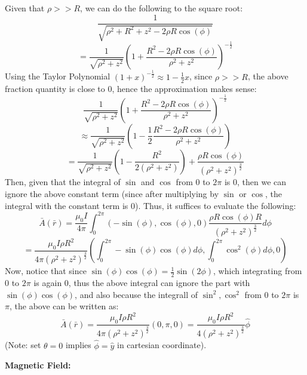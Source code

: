\documentclass{article}
\begin{document}
Given that $\rho>>R$, we can do the following to the square root:
$$\frac{1}{\sqrt{\rho^2+R^2+z^2-2\rho R\cos(\phi)}}$$
$$=\frac{1}{\sqrt{\rho^2+z^2}}\left(1+\frac{R^2-2\rho R\cos(\phi)}{\rho^2+z^2}\right)^{-\frac{1}{2}}$$
Using the Taylor Polynomial $(1+x)^{-\frac{1}{2}}\approx 1-\frac{1}{2}x$, since $\rho>>R$, the above fraction quantity is close to $0$, hence the approximation makes sense:
$$\frac{1}{\sqrt{\rho^2+z^2}}\left(1+\frac{R^2-2\rho R\cos(\phi)}{\rho^2+z^2}\right)^{-\frac{1}{2}}$$
$$\approx \frac{1}{\sqrt{\rho^2+z^2}}\left(1-\frac{1}{2}\frac{R^2-2\rho R\cos(\phi)}{\rho^2+z^2}\right)$$
$$=\frac{1}{\sqrt{\rho^2+z^2}}\left(1-\frac{R^2}{2(\rho^2+z^2)}\right)+\frac{\rho R\cos(\phi)}{(\rho^2+z^2)^{\frac{3}{2}}}$$
Then, given that the integral of $\sin$ and $\cos$ from $0$ to $2\pi$ is $0$, then we can ignore the above constant term (since after multiplying by $\sin$ or $\cos$, the integral with the constant term is $0$).
Thus, it suffices to evaluate the following:
$$\bar{A}(\bar{r})=\frac{\mu_0 I}{4\pi}\int_{0}^{2\pi}(-\sin(\phi),\cos(\phi),0)\frac{\rho R\cos(\phi)R}{(\rho^2+z^2)^{\frac{3}{2}}}d\phi$$
$$=\frac{\mu_0I\rho R^2}{4\pi(\rho^2+z^2)^{\frac{3}{2}}}\left(\int_{0}^{2\pi}-\sin(\phi)\cos(\phi)d\phi,\int_{0}^{2\pi}\cos^2(\phi)d\phi,0\right)$$
Now, notice that since $\sin(\phi)\cos(\phi)=\frac{1}{2}\sin(2\phi)$, which integrating from $0$ to $2\pi$ is again $0$, thus the above integral can ignore the part with $\sin(\phi)\cos(\phi)$, 
and also because the integrall of $\sin^2,\cos^2$ from $0$ to $2\pi$ is $\pi$, the above can be written as:
$$\bar{A}(\bar{r})=\frac{\mu_0I\rho R^2}{4\pi(\rho^2+z^2)^\frac{3}{2}}\left(0,\pi,0\right)=\frac{\mu_0I\rho R^2}{4(\rho^2+z^2)^\frac{3}{2}}\hat{\phi}$$
(Note: set $\theta=0$ implies $\hat{\phi}=\hat{y}$ in cartesian coordinate).

\hfill

\textbf{Magnetic Field:}
\end{document}
